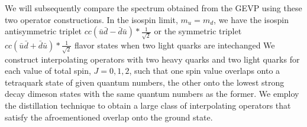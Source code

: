 We will subsequently compare the spectrum obtained from the GEVP using these two operator constructions. 
In the isospin limit, $m_u = m_d$, we have the isospin antisymmetric triplet $cc(\bar{u}\bar{d} - \bar{d}\bar{u}) * \frac{1}{\sqrt{2}}$ or the symmetric triplet $cc(\bar{u}\bar{d} + \bar{d}\bar{u}) * \frac{1}{\sqrt{2}}$  flavor states when two light quarks are intechanged \cite{Ortiz-Pacheco:2023ble} We construct interpolating operators with two heavy quarks and two light quarks for each value of total spin, $J=0,1,2$, such that one spin value overlaps onto a tetraquark state of given quantum numbers, the other onto the lowest strong decay dimeson states with the same quantum numbers as the former. We employ the distillation technique to obtain a large class of interpolating operators that satisfy the afroementioned overlap onto the ground state. 

